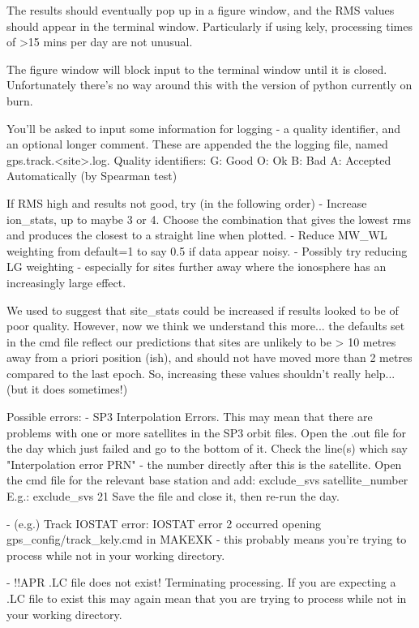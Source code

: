 \documentclass[11pt]{article} %
\begin{document}
The results should eventually pop up in a figure window, and the RMS values should appear in the terminal window. Particularly if using kely, processing times of >15 mins per day are not unusual.

The figure window will block input to the terminal window until it is closed. Unfortunately there's no way around this with the version of python currently on burn.

You'll be asked to input some information for logging - a quality identifier, and an optional longer comment. These are appended the the logging file, named gps.track.<site>.log.
Quality identifiers:
G: Good
O: Ok
B: Bad
A: Accepted Automatically (by Spearman test)

If RMS high and results not good, try (in the following order)
	- Increase ion_stats, up to maybe 3 or 4. Choose the combination that gives the lowest rms and produces the closest to a straight line when plotted.
	- Reduce MW_WL weighting from default=1 to say 0.5 if data appear noisy.
	- Possibly try reducing LG weighting - especially for sites further away where the ionosphere has an increasingly large effect.

We used to suggest that site_stats could be increased if results looked to be of poor quality. However, now we think we understand this more... the defaults set in the cmd file reflect our predictions that sites are unlikely to be > 10 metres away from a priori position (ish), and should not have moved more than 2 metres compared to the last epoch. So, increasing these values shouldn't really help... (but it does sometimes!)

Possible errors:
 - SP3 Interpolation Errors. This may mean that there are problems with one or more satellites in the SP3 orbit files. Open the .out file for the day which just failed and go to the bottom of it. Check the line(s) which say "Interpolation error PRN" - the number directly after this is the satellite. Open the cmd file for the relevant base station and add:
  exclude_svs satellite_number
E.g.:
  exclude_svs 21
Save the file and close it, then re-run the day. 

- (e.g.) Track IOSTAT error:  IOSTAT error      2 occurred opening gps_config/track_kely.cmd in MAKEXK - this probably means you're trying to process while not in your working directory.

- !!APR .LC file does not exist! Terminating processing. If you are expecting a .LC file to exist this may again mean that you are trying to process while not in your working directory.
\end{document}
